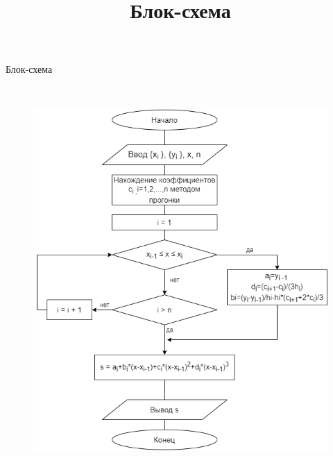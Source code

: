 \newpage

\title{Блок-схема}{\begin{center}
    Блок-схема
\end{center}} \\
\begin{figure}[H]
\includegraphics[width = 1\textwidth]{comp-math-lab3.png}
 
\end{figure} 

\newpage

